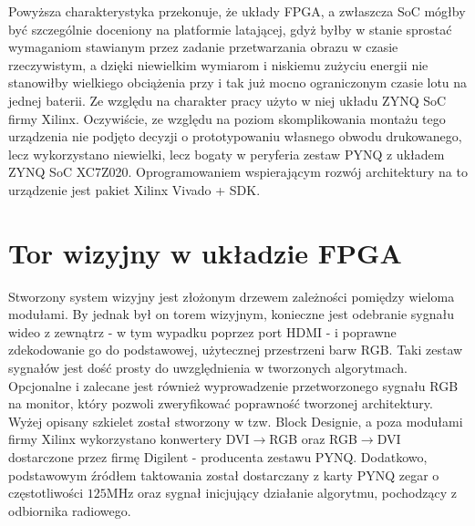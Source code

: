 Powyższa charakterystyka przekonuje, że układy FPGA, a zwłaszcza SoC mógłby być szczególnie doceniony na platformie latającej, gdyż byłby w stanie sprostać wymaganiom stawianym przez zadanie przetwarzania obrazu w czasie rzeczywistym, a dzięki niewielkim wymiarom i niskiemu zużyciu energii nie stanowiłby wielkiego obciążenia przy i tak już mocno ograniczonym czasie lotu na jednej baterii. \newline
Ze względu na charakter pracy użyto w niej układu ZYNQ SoC firmy Xilinx. Oczywiście, ze względu na poziom skomplikowania montażu tego urządzenia nie podjęto decyzji o prototypowaniu własnego obwodu drukowanego, lecz wykorzystano niewielki, lecz bogaty w peryferia zestaw PYNQ z układem ZYNQ SoC XC7Z020. Oprogramowaniem wspierającym rozwój architektury na to urządzenie jest pakiet Xilinx Vivado + SDK.

\section{Tor wizyjny w układzie FPGA}
\label{sec:counter}
Stworzony system wizyjny jest złożonym drzewem zależności pomiędzy wieloma modułami. By jednak był on torem wizyjnym, konieczne jest odebranie sygnału wideo z zewnątrz - w tym wypadku poprzez port HDMI - i poprawne zdekodowanie go do podstawowej, użytecznej przestrzeni barw RGB. Taki zestaw sygnałów jest dość prosty do uwzględnienia w tworzonych algorytmach. Opcjonalne i zalecane jest również wyprowadzenie przetworzonego sygnału RGB na monitor, który pozwoli zweryfikować poprawność tworzonej architektury. Wyżej opisany szkielet został stworzony w tzw. Block Designie, a poza modułami firmy Xilinx wykorzystano konwertery DVI$\rightarrow$RGB oraz RGB$\rightarrow$DVI dostarczone przez firmę Digilent - producenta zestawu PYNQ. Dodatkowo, podstawowym źródłem taktowania został dostarczany z karty PYNQ zegar o częstotliwości $125$MHz oraz sygnał inicjujący działanie algorytmu, pochodzący z odbiornika radiowego.

 

